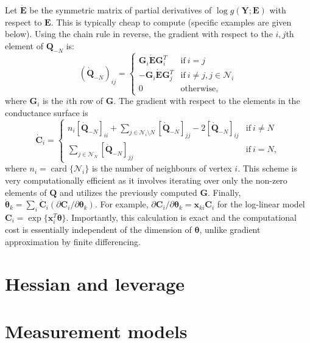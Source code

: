 \documentclass[11pt]{article}
\DeclareMathOperator*{\card}{card}
\newcommand{\mat}[1]{\mathbf{#1}}
\begin{document}
Let $\dot{\mat E}$ be the symmetric matrix of partial derivatives of $\log g(\mat Y; \mat E)$
with respect to $\mat E$. This is typically cheap to
compute (specific examples are given below). Using the chain rule in reverse, 
the gradient with respect to the $i,j$th element of $\mat Q_{-N}$ is:
\begin{equation}
  \label{qdiff}
  (\dot{\mat Q}_{-N})_{ij} = \begin{cases} 
    \mat G_i \dot{\mat E} \mat G_i^T & \mathrm{if~} i = j \\
    -\mat G_i \dot{\mat E} \mat G_j^T & \mathrm{if~} i \neq j, j \in \mathcal{N}_i \\
    0 & \mathrm{otherwise,}
  \end{cases}
\end{equation}
where $\mat G_i$ is the $i$th row of $\mat G$. The gradient with respect to the elements in the
conductance surface is
\[
  \dot{\mat C}_i = \begin{cases}
    n_i [\dot{\mat Q}_{-N}]_{ii} + \sum_{j \in \mathcal{N}_i \setminus N } [\dot{\mat Q}_{-N}]_{jj} - 2 [\dot{\mat Q}_{-N}]_{ij} & \mathrm{if~} i \neq N \\
    \sum_{j \in \mathcal{N}_N} [\dot{\mat Q}_{-N}]_{jj} & \mathrm{if~} i = N,
  \end{cases}
\]
where $n_i = \card \{ \mathcal{N}_i \}$ is the number of neighbours of vertex $i$. This scheme
is very computationally efficient as it involves iterating over only the
non-zero elements of $\mat Q$ and utilizes the previously computed 
$\mat G$. Finally, 
$\dot{\bm \theta}_k = \sum_i \dot{\mat C}_i (\partial{\mat C_i} / \partial{\bm \theta_k})$. 
For example, $\partial{\mat C_i} / \partial{\bm \theta_k} = \mat x_{ki} \mat C_i$
for the log-linear model $\mat C_i = \exp\{ \mat x_i^T \bm \theta \}$. Importantly,
this calculation is exact and the computational cost is essentially independent of the
dimension of $\bm \theta$, unlike gradient approximation by finite differencing.

\section{Hessian and leverage}


\section{Measurement models}
\end{document}
